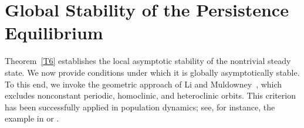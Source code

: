 \documentclass[reqno,11pt]{amsart}
\numberwithin{equation}{section}
\begin{document}
\section{Global Stability of the  Persistence Equilibrium}\label{sec:7}

Theorem~\ref{T6} establishes the local asymptotic stability of the nontrivial steady state. We now provide conditions under which it is globally asymptotically stable. To this end, we invoke the geometric approach of Li and Muldowney~\cite{LiMuldowney1996}, which excludes nonconstant periodic, homoclinic, and heteroclinic orbits. This criterion has been successfully applied in population dynamics; see, for instance, the example in \cite{LiMuldowney1996} or \cite{Li-Smith-Wang_01}.\\
\end{document}
